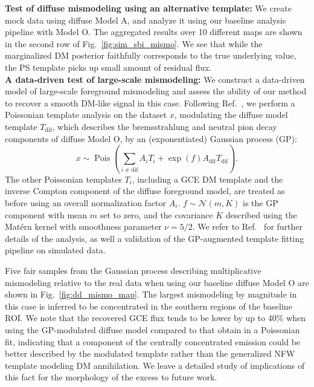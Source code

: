 \documentclass[prd,aps,10pt,nofootinbib,twocolumn,superscriptaddress,preprintnumbers,balancelastpage,longbibliography]{revtex4-1}
\begin{document}
\noindent
\textbf{Test of diffuse mismodeling using an alternative template:}
We create mock data using diffuse Model A, and analyze it using our baseline analysis pipeline with Model O. The aggregated results over 10 different maps are shown in the second row of Fig.~\ref{fig:sim_sbi_mismo}. We see that while the marginalized DM posterior faithfully corresponds to the true underlying value, the PS template picks up small amount of residual flux. \\

\noindent
\textbf{A data-driven test of large-scale mismodeling:}
We construct a data-driven model of large-scale foreground mismodeling and assess the ability of our method to recover a smooth DM-like signal in this case. Following Ref.~\cite{Mishra-Sharma:2020kjb}, we perform a Poissonian template analysis on the \Fermi dataset $x$, modulating the diffuse model template $T_{\mathrm{dif}}$, which describes the bremsstrahlung and neutral pion decay components of diffuse Model O, by an (exponentiated) Gaussian process (GP):
\begin{equation}
x \sim \operatorname{Pois}\left(\sum_{i \neq \mathrm{dif}} A_{i} T_{i}+\exp \left(f\right) A_{\mathrm{dif}} T_{\mathrm{dif}}\right).
\end{equation}
The other Poissonian templates $T_{i}$, including a GCE DM template and the inverse Compton component of the diffuse foreground model, are treated as before using an overall normalization factor $A_{i}$. $f \sim \mathcal{N}(m, K)$ is the GP component with mean $m$ set to zero, and the covariance $K$ described using the Mat\'ern kernel with smoothness parameter $\nu = 5/2$. We refer to Ref.~\cite{Mishra-Sharma:2020kjb} for further details of the analysis, as well a validation of the GP-augmented template fitting pipeline on simulated data.

Five fair samples from the Gaussian process describing multiplicative mismodeling relative to the real \Fermi data when using our baseline diffuse Model O are shown in Fig.~\ref{fig:dd_mismo_map}. The largest mismodeling by magnitude in this case is inferred to be concentrated in the southern regions of the baseline ROI. We note that the recovered GCE flux tends to be lower by up to 40\% when using the GP-modulated diffuse model compared to that obtain in a Poissonian fit, indicating that a component of the centrally concentrated emission could be better described by the modulated template rather than the generalized NFW template modeling DM annihilation. We leave a detailed study of implications of this fact for the morphology of the excess to future work.
\end{document}
